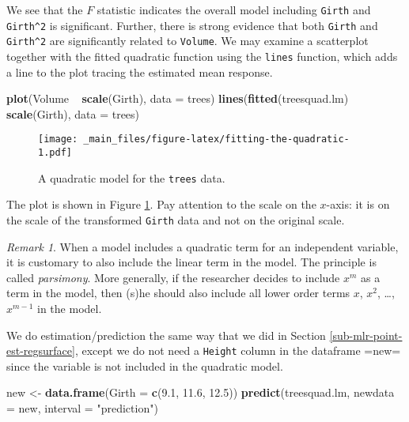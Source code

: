 \documentclass[]{book}
\newenvironment{Shaded}{\begin{snugshade}}{\end{snugshade}}
\newcommand{\KeywordTok}[1]{\textcolor[rgb]{0.13,0.29,0.53}{\textbf{{#1}}}}
\newcommand{\DataTypeTok}[1]{\textcolor[rgb]{0.13,0.29,0.53}{{#1}}}
\newcommand{\FloatTok}[1]{\textcolor[rgb]{0.00,0.00,0.81}{{#1}}}
\newcommand{\StringTok}[1]{\textcolor[rgb]{0.31,0.60,0.02}{{#1}}}
\newcommand{\NormalTok}[1]{{#1}}
\numberwithin{equation}{chapter}
\numberwithin{figure}{chapter}
\theoremstyle{plain}
\theoremstyle{definition}
\theoremstyle{remark}
\newtheorem{rem}[thm]{Remark}
\theoremstyle{definition}
\theoremstyle{definition}
\theoremstyle{remark}
\begin{document}
We see that the \(F\) statistic indicates the overall model including
\texttt{Girth} and \texttt{Girth\^{}2} is significant. Further, there is
strong evidence that both \texttt{Girth} and \texttt{Girth\^{}2} are
significantly related to \texttt{Volume}. We may examine a scatterplot
together with the fitted quadratic function using the \texttt{lines}
function, which adds a line to the plot tracing the estimated mean
response.

\begin{Shaded}
\begin{Highlighting}[]
\KeywordTok{plot}\NormalTok{(Volume ~}\StringTok{ }\KeywordTok{scale}\NormalTok{(Girth), }\DataTypeTok{data =} \NormalTok{trees)}
\KeywordTok{lines}\NormalTok{(}\KeywordTok{fitted}\NormalTok{(treesquad.lm) ~}\StringTok{ }\KeywordTok{scale}\NormalTok{(Girth), }\DataTypeTok{data =} \NormalTok{trees)}
\end{Highlighting}
\end{Shaded}

\begin{figure}[htbp]
\centering
\texttt{[image: \_main\_files/figure-latex/fitting-the-quadratic-1.pdf]}
\caption{\label{fig:fitting-the-quadratic}\small A quadratic model for the
\texttt{trees} data.}
\end{figure}




The plot is shown in Figure \ref{fig:fitting-the-quadratic}. Pay
attention to the scale on the \(x\)-axis: it is on the scale of the
transformed \texttt{Girth} data and not on the original scale.

\bigskip

\begin{rem}
When a model includes a quadratic term for an independent variable, it
is customary to also include the linear term in the model. The principle
is called \emph{parsimony}. More generally, if the researcher decides to
include \(x^{m}\) as a term in the model, then (s)he should also include
all lower order terms \(x\), \(x^{2}\), \ldots{},\(x^{m-1}\) in the
model.
\end{rem}

We do estimation/prediction the same way that we did in Section
\ref{sub-mlr-point-est-regsurface}, except we do not need a
\texttt{Height} column in the dataframe =new= since the variable is not
included in the quadratic model.

\begin{Shaded}
\begin{Highlighting}[]
\NormalTok{new <-}\StringTok{ }\KeywordTok{data.frame}\NormalTok{(}\DataTypeTok{Girth =} \KeywordTok{c}\NormalTok{(}\FloatTok{9.1}\NormalTok{, }\FloatTok{11.6}\NormalTok{, }\FloatTok{12.5}\NormalTok{))}
\KeywordTok{predict}\NormalTok{(treesquad.lm, }\DataTypeTok{newdata =} \NormalTok{new, }\DataTypeTok{interval =} \StringTok{"prediction"}\NormalTok{)}
\end{Highlighting}
\end{Shaded}
\end{document}

